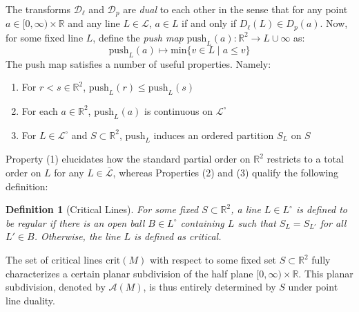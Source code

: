 \documentclass[sn-mathphys]{sn-jnl}
\newtheorem{definition}{Definition}
\begin{document}
The transforms $\mathcal{D}_{\ell}$ and $\mathcal{D}_p$ are \emph{dual} to each other in the sense that for any point $a \in [0, \infty) \times \mathbb{R}$ and any line $L \in \mathcal{L}$, $a \in L$ if and only if $D_\ell(L) \in D_{p}(a)$. Now, for some fixed line $L$, define  the \emph{push map} $\mathrm{push}_L(a):  \mathbb{R}^2 \to L \cup \infty$ as: 
\begin{equation}
	\mathrm{push}_L(a) \mapsto \mathrm{min}\{ v \in L \mid a \leq v \}
\end{equation}
The push map satisfies a number of useful properties. Namely: 
\begin{enumerate}
	\item For $r < s \in \mathbb{R}^2$, $\mathrm{push}_L(r) \leq \mathrm{push}_L(s)$
	\item For each $a \in \mathbb{R}^2$, $\mathrm{push}_L(a)$ is continuous on $\mathcal{L}^\circ$
	\item For $L \in \mathcal{L}^\circ$ and $S \subset \mathbb{R}^2$, $\mathrm{push}_L$ induces an ordered partition $S_L$ on $S$ 
\end{enumerate}
Property (1) elucidates how the standard partial order on $\mathbb{R}^2$ restricts to a total order on $L$ for any $L \in \overline{\mathcal{L}}$, whereas Properties (2) and (3) qualify the following definition:
\begin{definition}[Critical Lines]
	For some fixed $S \subset \mathbb{R}^2$, a line $L \in L^\circ$ is defined to be \emph{regular} if there is an open ball $B \in L^\circ$ containing $L$ such that $S_L = S_{L'}$ for all $L' \in B$. Otherwise, the line $L$ is defined as \emph{critical}. 
\end{definition}
\noindent The set of critical lines $\mathrm{crit}(M)$ with respect to some fixed set $S \subset \mathbb{R}^2$ fully characterizes a certain planar subdivision of the half plane $[0, \infty) \times \mathbb{R}$. 
This planar subdivision, denoted by $\mathcal{A}(M)$, is thus entirely determined by $S$ under point line duality.
\end{document}
